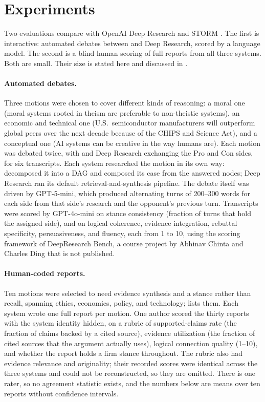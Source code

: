 \section{Experiments}
\label{sec:experiments}

Two evaluations compare \sys{} with OpenAI Deep Research \citep{openai2025deepresearch} and STORM \citep{shao2024storm}. The first is interactive: automated debates between \sys{} and Deep Research, scored by a language model. The second is a blind human scoring of full reports from all three systems. Both are small. Their size is stated here and discussed in .

\paragraph{Automated debates.}
Three motions were chosen to cover different kinds of reasoning: a moral one (moral systems rooted in theism are preferable to non-theistic systems), an economic and technical one (U.S.\ semiconductor manufacturers will outperform global peers over the next decade because of the CHIPS and Science Act), and a conceptual one (AI systems can be creative in the way humans are). Each motion was debated twice, with \sys{} and Deep Research exchanging the Pro and Con sides, for six transcripts. Each system researched the motion in its own way: \sys{} decomposed it into a DAG and composed its case from the answered nodes; Deep Research ran its default retrieval-and-synthesis pipeline. The debate itself was driven by GPT-5-mini, which produced alternating turns of 200--300 words for each side from that side's research and the opponent's previous turn.
Transcripts were scored by GPT-4o-mini on stance consistency (fraction of turns that hold the assigned side), and on logical coherence, evidence integration, rebuttal specificity, persuasiveness, and fluency, each from 1 to 10, using the scoring framework of DeepResearch Bench, a course project by Abhinav Chinta and Charles Ding that is not published.

\paragraph{Human-coded reports.}
Ten motions were selected to need evidence synthesis and a stance rather than recall, spanning ethics, economics, policy, and technology;  lists them. Each system wrote one full report per motion. One author scored the thirty reports with the system identity hidden, on a rubric of supported-claims rate (the fraction of claims backed by a cited source), evidence utilization (the fraction of cited sources that the argument actually uses), logical connection quality (1--10), and whether the report holds a firm stance throughout. The rubric also had evidence relevance and originality; their recorded scores were identical across the three systems and could not be reconstructed, so they are omitted. There is one rater, so no agreement statistic exists, and the numbers below are means over ten reports without confidence intervals.

